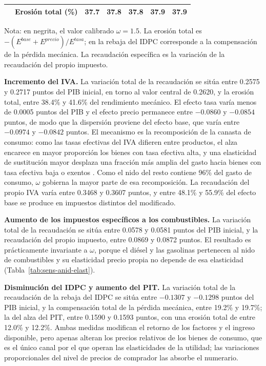 \documentclass[11pt]{article}
\begin{document}
\begin{table}[H]
\begin{tabular}{|l|l|r|r|r|r|r|}
  & Erosión total (\%) & 37.7 & 37.8 & 37.8 & \textbf{37.9} & 37.9 \\
  \hline
\end{tabular}
\par\smallskip
\begin{minipage}{\textwidth}
\footnotesize Nota: en negrita, el valor calibrado $\omega=1.5$. La erosión total es $-(E^{base}+E^{precio})/E^{tasa}$; en la rebaja del IDPC corresponde a la compensación de la pérdida mecánica. La recaudación específica es la variación de la recaudación del propio impuesto.
\end{minipage}
\end{table}

\textbf{Incremento del IVA.} La variación total de la recaudación se sitúa entre 0.2575 y 0.2717 puntos del PIB inicial, en torno al valor central de 0.2620, y la erosión total, entre 38.4\% y 41.6\% del rendimiento mecánico. El efecto tasa varía menos de 0.0005 puntos del PIB y el efecto precio permanece entre $-0.0860$ y $-0.0854$ puntos, de modo que la dispersión proviene del efecto base, que varía entre $-0.0974$ y $-0.0842$ puntos. El mecanismo es la recomposición de la canasta de consumo: como las tasas efectivas del IVA difieren entre productos, el alza encarece en mayor proporción los bienes con tasa efectiva alta, y una elasticidad de sustitución mayor desplaza una fracción más amplia del gasto hacia bienes con tasa efectiva baja o exentos \cite{atkinson_stiglitz_1980}. Como el nido del resto contiene 96\% del gasto de consumo, $\omega$ gobierna la mayor parte de esa recomposición. La recaudación del propio IVA varía entre 0.3468 y 0.3607 puntos, y entre 48.1\% y 55.9\% del efecto base se produce en impuestos distintos del modificado.

\textbf{Aumento de los impuestos específicos a los combustibles.} La variación total de la recaudación se sitúa entre 0.0578 y 0.0581 puntos del PIB inicial, y la recaudación del propio impuesto, entre 0.0869 y 0.0872 puntos. El resultado es prácticamente invariante a $\omega$, porque el diésel y las gasolinas pertenecen al nido de combustibles y su elasticidad precio propia no depende de esa elasticidad (Tabla~\ref{tab:sens-anid-elast}).

\textbf{Disminución del IDPC y aumento del PIT.} La variación total de la recaudación de la rebaja del IDPC se sitúa entre $-0.1307$ y $-0.1298$ puntos del PIB inicial, y la compensación total de la pérdida mecánica, entre 19.2\% y 19.7\%; la del alza del PIT, entre 0.1590 y 0.1593 puntos, con una erosión total de entre 12.0\% y 12.2\%. Ambas medidas modifican el retorno de los factores y el ingreso disponible, pero apenas alteran los precios relativos de los bienes de consumo, que es el único canal por el que operan las elasticidades de la utilidad; las variaciones proporcionales del nivel de precios de comprador las absorbe el numerario.
\end{document}
